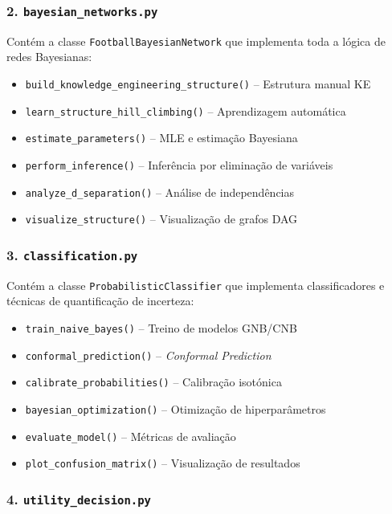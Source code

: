 \documentclass[12pt, a4paper]{article}
\begin{document}
\subsubsection{2. \texttt{bayesian\_networks.py}}

Contém a classe \texttt{FootballBayesianNetwork} que implementa toda a lógica de redes Bayesianas:

\begin{itemize}
  \item \texttt{build\_knowledge\_engineering\_structure()} -- Estrutura manual KE
  \item \texttt{learn\_structure\_hill\_climbing()} -- Aprendizagem automática
  \item \texttt{estimate\_parameters()} -- MLE e estimação Bayesiana
  \item \texttt{perform\_inference()} -- Inferência por eliminação de variáveis
  \item \texttt{analyze\_d\_separation()} -- Análise de independências
  \item \texttt{visualize\_structure()} -- Visualização de grafos DAG
\end{itemize}

\subsubsection{3. \texttt{classification.py}}

Contém a classe \texttt{ProbabilisticClassifier} que implementa classificadores e técnicas de quantificação de incerteza:

\begin{itemize}
  \item \texttt{train\_naive\_bayes()} -- Treino de modelos GNB/CNB
  \item \texttt{conformal\_prediction()} -- \textit{Conformal Prediction}
  \item \texttt{calibrate\_probabilities()} -- Calibração isotónica
  \item \texttt{bayesian\_optimization()} -- Otimização de hiperparâmetros
  \item \texttt{evaluate\_model()} -- Métricas de avaliação
  \item \texttt{plot\_confusion\_matrix()} -- Visualização de resultados
\end{itemize}

\subsubsection{4. \texttt{utility\_decision.py}}
\end{document}
